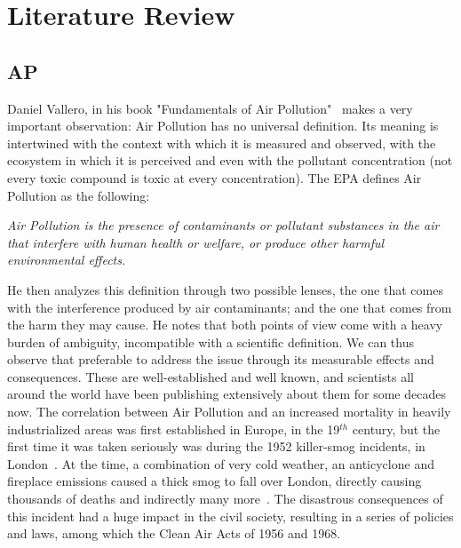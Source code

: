 \chapter{Literature Review}%
\label{cha:literature_review}

\section{\acrlong{AP}}%
\label{sec:ap}

Daniel Vallero, in his book "Fundamentals of Air
Pollution"~\cite{Vallero2014} makes a very important observation: Air
Pollution has no universal definition. Its meaning is intertwined with
the context with which it is measured and observed, with the ecosystem
in which it is perceived and even with the pollutant concentration (not
every toxic compound is toxic at every concentration). The \gls{EPA}
defines Air Pollution as the following:

\begin{center}
    \begin{minipage}{0.8\textwidth}

        \noindent
            \textit{Air Pollution is the presence of contaminants or pollutant
            substances in the air that interfere with human health or welfare,
            or produce other harmful environmental effects.}

    \end{minipage}
\end{center}

He then analyzes this definition through two possible lenses, the one
that comes with the interference produced by air contaminants; and the
one that comes from the harm they may cause. He notes that both points
of view come with a heavy burden of ambiguity, incompatible with a
scientific definition. We can thus observe that preferable to address
the issue through its measurable effects and consequences. These are
well-established and well known, and scientists all around the world
have been publishing extensively about them for some decades now. The
correlation between Air Pollution and an increased mortality in heavily
industrialized areas was first established in Europe, in the 19$^{th}$
century, but the first time it was taken seriously was during the 1952
killer-smog incidents, in London~\cite{Platt2007}. At the time, a
combination of very cold weather, an anticyclone and fireplace emissions
caused a thick smog to fall over London, directly causing thousands of
deaths and indirectly many more~\cite{Bell2008,Office2019}. The
disastrous consequences of this incident had a huge impact in the civil
society, resulting in a series of policies and laws, among which the
Clean Air Acts of 1956 and 1968.

